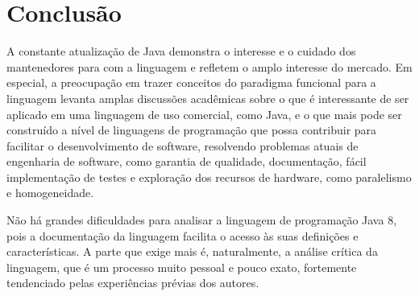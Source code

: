 \documentclass{article}
\begin{document}
\section{Conclusão}
A constante atualização de Java demonstra o interesse e o cuidado dos mantenedores para com a linguagem e refletem o amplo interesse do mercado. Em especial, a preocupação em trazer conceitos do paradigma funcional para a linguagem levanta amplas discussões acadêmicas sobre o que é interessante de ser aplicado em uma linguagem de uso comercial, como Java, e o que mais pode ser construído a nível de linguagens de programação que possa contribuir para facilitar o desenvolvimento de software, resolvendo problemas atuais de engenharia de software, como garantia de qualidade, documentação, fácil implementação de testes e exploração dos recursos de hardware, como paralelismo e homogeneidade.

Não há grandes dificuldades para analisar a linguagem de programação Java 8, pois a documentação da linguagem facilita o acesso às suas definições e características. A parte que exige mais é, naturalmente, a análise crítica da linguagem, que é um processo muito pessoal e pouco exato, fortemente tendenciado pelas experiências prévias dos autores.
\end{document}
